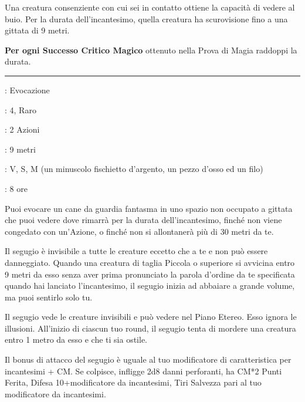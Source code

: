 \begin{multicols}{2}
Una creatura consenziente con cui sei in contatto ottiene la capacità di vedere al buio. Per la durata dell'incantesimo, quella creatura ha scurovisione fino a una gittata di 9 metri.

\textbf{Per ogni Successo Critico Magico} ottenuto nella Prova di Magia raddoppi la durata.

\smallskip\noindent\rule{\linewidth}{2pt} \hypertarget{Segugio Fedele}{}\smallskip{}
\noindent
\begin{description}[noitemsep, topsep=0pt, parsep=0pt, partopsep=0pt, leftmargin=0cm, labelwidth=2.8cm]
	\item[\textbf{Lista di Magia}]: Evocazione
	\item[\textbf{Livello}]: 4, Raro
	\item[\textbf{T. di Lancio}]: 2 Azioni
	\item[\textbf{Gittata}]: 9 metri
	\item[\textbf{Componenti}]: V, S, M (un minuscolo fischietto d'argento, un pezzo d'osso ed un filo)
	\item[\textbf{Durata}]: 8 ore
\end{description}

Puoi evocare un cane da guardia fantasma in uno spazio non occupato a gittata che puoi vedere dove rimarrà per la durata dell'incantesimo, finché non viene congedato con un'Azione, o finché non si allontanerà più di 30 metri da te.

Il segugio è invisibile a tutte le creature eccetto che a te e non può essere danneggiato. Quando una creatura di taglia Piccola o superiore si avvicina entro 9 metri da esso senza aver prima pronunciato la parola d'ordine da te specificata quando hai lanciato l'incantesimo, il segugio inizia ad abbaiare a grande volume, ma puoi sentirlo solo tu.

Il segugio vede le creature invisibili e può vedere nel Piano Etereo. Esso ignora le illusioni. All'inizio di ciascun tuo round, il segugio tenta di mordere una creatura entro 1 metro da esso e che ti sia ostile.

Il bonus di attacco del segugio è uguale al tuo modificatore di caratteristica per incantesimi + CM. Se colpisce, infligge 2d8 danni perforanti, ha CM*2 Punti Ferita, Difesa 10+modificatore da incantesimi, Tiri Salvezza pari al tuo modificatore da incantesimi.


\end{multicols}
